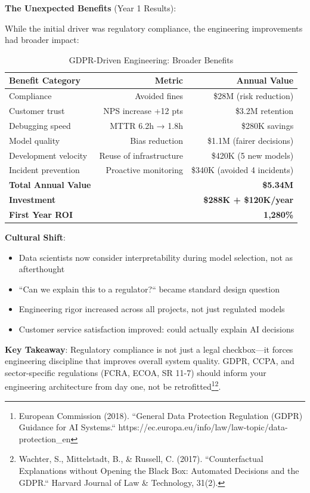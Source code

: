 \textbf{The Unexpected Benefits} (Year 1 Results):

While the initial driver was regulatory compliance, the engineering improvements had broader impact:

\begin{table}[h]
\centering
\caption{GDPR-Driven Engineering: Broader Benefits}
\begin{tabular}{lrr}
\toprule
\textbf{Benefit Category} & \textbf{Metric} & \textbf{Annual Value} \\
\midrule
Compliance & Avoided fines & \$28M (risk reduction) \\
Customer trust & NPS increase +12 pts & \$3.2M retention \\
Debugging speed & MTTR 6.2h → 1.8h & \$280K savings \\
Model quality & Bias reduction & \$1.1M (fairer decisions) \\
Development velocity & Reuse of infrastructure & \$420K (5 new models) \\
Incident prevention & Proactive monitoring & \$340K (avoided 4 incidents) \\
\midrule
\textbf{Total Annual Value} & & \textbf{\$5.34M} \\
\midrule
\textbf{Investment} & & \textbf{\$288K + \$120K/year} \\
\textbf{First Year ROI} & & \textbf{1,280\%} \\
\bottomrule
\end{tabular}
\end{table}

\textbf{Cultural Shift}:
\begin{itemize}
    \item Data scientists now consider interpretability during model selection, not as afterthought
    \item ``Can we explain this to a regulator?`` became standard design question
    \item Engineering rigor increased across all projects, not just regulated models
    \item Customer service satisfaction improved: could actually explain AI decisions
\end{itemize}

\textbf{Key Takeaway}: Regulatory compliance is not just a legal checkbox---it forces engineering discipline that improves overall system quality. GDPR, CCPA, and sector-specific regulations (FCRA, ECOA, SR 11-7) should inform your engineering architecture from day one, not be retrofitted\footnote{European Commission (2018). ``General Data Protection Regulation (GDPR) Guidance for AI Systems.`` https://ec.europa.eu/info/law/law-topic/data-protection\_en}\footnote{Wachter, S., Mittelstadt, B., \& Russell, C. (2017). ``Counterfactual Explanations without Opening the Black Box: Automated Decisions and the GDPR.`` Harvard Journal of Law \& Technology, 31(2).}.

